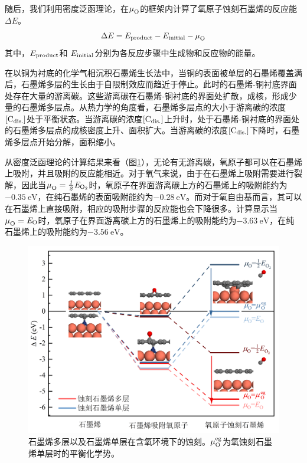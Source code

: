 随后，我们利用密度泛函理论，在$\mu_{\rm O}^{\rm } \it$的框架内计算了氧原子蚀刻石墨烯的反应能$\Delta E$。
\begin{equation}
    \Delta E = E_{\rm product} - E_{\rm initial} - \mu_{\rm O}^{\rm } \it
\end{equation}
其中，$E_{\rm product}$和 $E_{\rm initial}$分别为各反应步骤中生成物和反应物的能量。

在以铜为衬底的化学气相沉积石墨烯生长法中，当铜的表面被单层的石墨烯覆盖满后，石墨烯多层的生长由于自限制效应而趋近于停止。此时的石墨烯-铜衬底界面处存在大量的游离碳。这些游离碳在石墨烯-铜衬底的界面处扩散，成核，形成少量的石墨烯多层点。从热力学的角度看，石墨烯多层点的大小于游离碳的浓度$\rm{\left[C_{dis.}\right]} \it$处于平衡状态。当游离碳的浓度$\rm{\left[C_{dis.}\right]} \it$上升时，处于石墨烯-铜衬底的界面处的石墨烯多层点的成核密度上升、面积扩大。当游离碳的浓度$\rm{\left[C_{dis.}\right]} \it$下降时，石墨烯多层点开始分解，面积缩小。

从密度泛函理论的计算结果来看（图\ref{fig:FLG_DFT_Oetch}），无论有无游离碳，氧原子都可以在石墨烯上吸附，并且吸附的反应能相近。对于氧气来说，由于在石墨烯上吸附需要进行裂解，因此当$\muO{}=\halfEOm$时，氧原子在界面游离碳上方的石墨烯上的吸附能约为$\SI{-0.35}{\electronvolt}$，在纯石墨烯的表面吸附能约为$\SI{-0.28}{\electronvolt}$。而对于氧自由基而言，其可以在石墨烯上直接吸附，相应的吸附步骤的反应能也会下降很多。计算显示当$\mu_{\rm O}^{\rm } \it=\it E_{\rm O} \it$时，氧原子在界面游离碳上方的石墨烯上的吸附能约为$\SI{-3.63}{\electronvolt}$，在纯石墨烯上的吸附能约为$\SI{-3.56}{\electronvolt}$。

\begin{figure}[htb]
    \includegraphics{pic/FLG_DFT_Oetch.png}
    \caption{
        石墨烯多层以及石墨烯单层在含氧环境下的蚀刻。$\mu_{\rm O}^{\rm eg} \it$为氧蚀刻石墨烯单层时的平衡化学势。
    }
    \label{fig:FLG_DFT_Oetch}
\end{figure}

